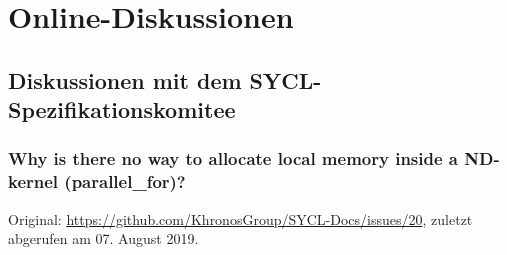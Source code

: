 \chapter{Online-Diskussionen}\label{anhang:diskussionen}

\section{Diskussionen mit dem SYCL-Spezifikationskomitee}
\label{anhang:diskussionen:syclspec}

\subsection{Why is there no way to allocate local memory inside a ND-kernel
            (parallel\_for)?}\label{anhang:diskussionen:syclspec:staticshared}

Original: \url{https://github.com/KhronosGroup/SYCL-Docs/issues/20}, zuletzt
abgerufen am 07. August 2019.

